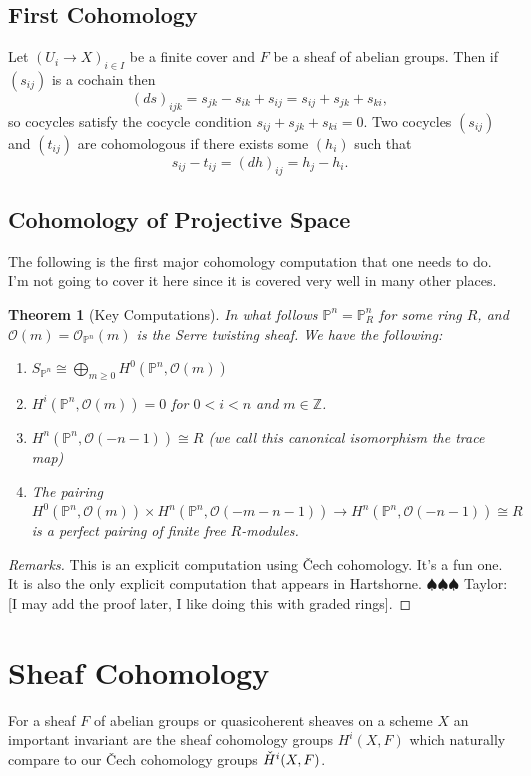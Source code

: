 \documentclass[12pt]{article}
\numberwithin{equation}{section}
\newtheorem{theorem}{Theorem}[subsection]
\theoremstyle{definition}
\theoremstyle{remark}
\newcommand{\ZZ}{\mathbb{Z}}
\newcommand{\Ocal}{\mathcal{O}}
\newcommand{\PP}{\mathbb{P}}
\newcommand{\Hv}{\Check{H}}
\newcommand{\taylor}[1]{{\color{blue} \sf $\spadesuit\spadesuit\spadesuit$ Taylor: [#1]}}
\begin{document}
\subsection{First Cohomology}
Let $(U_i\to X)_{i\in I}$ be a finite cover and $F$ be a sheaf of abelian groups. 
Then if $(s_{ij})$ is a cochain then 
 $$ (ds)_{ijk} = s_{jk}-s_{ik}+s_{ij} = s_{ij} + s_{jk} + s_{ki}, $$
so cocycles satisfy the cocycle condition $s_{ij}+s_{jk}+s_{ki}=0$. 
Two cocycles $(s_{ij})$ and $(t_{ij})$ are cohomologous if there exists some $(h_i)$ such that 
 $$ s_{ij}  - t_{ij} = (dh)_{ij} = h_j-h_i.$$

\subsection{Cohomology of Projective Space}
The following is the first major cohomology computation that one needs to do. 
I'm not going to cover it here since it is covered very well in many other places. 
\begin{theorem}[Key Computations]\label{thm:cohomology-of-projective-space}
	In what follows $\PP^n=\PP^n_R$ for some ring $R$, and $\Ocal(m) = \Ocal_{\PP^n}(m)$ is the Serre twisting sheaf. 
	We have the following:
	\begin{enumerate}
		\item $S_{\PP^n} \cong \bigoplus_{m\geq 0} H^0(\PP^n, \Ocal(m))$
		\item $H^i(\PP^n,\Ocal(m))=0$ for $0<i<n$ and $m\in \ZZ$.
		\item $H^n(\PP^n,\Ocal(-n-1))\cong R$ (we call this canonical isomorphism the trace map)
		\item The pairing $H^0(\PP^n,\Ocal(m))\times H^n(\PP^n,\Ocal(-m-n-1)) \to H^n(\PP^n,\Ocal(-n-1)) \cong R$ is a perfect pairing of finite free $R$-modules.
	\end{enumerate}
\end{theorem}
\begin{proof}[Remarks]
	This is an explicit computation using \v{C}ech cohomology. 
	It's a fun one. 
	It is also the only explicit computation that appears in Hartshorne. 
	\taylor{I may add the proof later, I like doing this with graded rings}.
\end{proof}

\section{Sheaf Cohomology}
For a sheaf $F$ of abelian groups or quasicoherent sheaves on a scheme $X$ an important invariant are the sheaf cohomology groups $H^i(X,F)$ which naturally compare to our \v{C}ech cohomology groups $\Hv^i(X,F)$.
\end{document}

